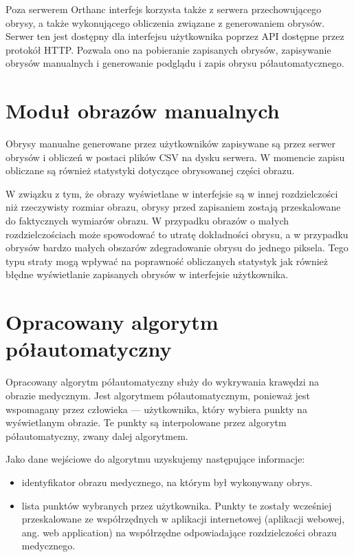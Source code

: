\documentclass[a4paper,11pt,twoside,openright]{report}
\theoremstyle{definition}
\begin{document}
Poza serwerem Orthanc interfejs korzysta także z serwera przechowującego obrysy,
a także wykonującego obliczenia związane z generowaniem obrysów. Serwer ten jest
dostępny dla interfejsu użytkownika poprzez API dostępne przez protokół HTTP.
Pozwala ono na pobieranie zapisanych obrysów, zapisywanie obrysów manualnych i
generowanie podglądu i zapis obrysu półautomatycznego.

\section {Moduł obrazów manualnych}

Obrysy manualne generowane przez użytkowników zapisywane są przez serwer obrysów
i obliczeń w postaci plików CSV na dysku serwera. W momencie zapisu obliczane są
również statystyki dotyczące obrysowanej części obrazu.

W związku z tym, że obrazy wyświetlane w interfejsie są w innej rozdzielczości
niż rzeczywisty rozmiar obrazu, obrysy przed zapisaniem zostają przeskalowane do
faktycznych wymiarów obrazu. W przypadku obrazów o małych rozdzielczościach może
spowodować to utratę dokładności obrysu, a w przypadku obrysów bardzo małych
obszarów zdegradowanie obrysu do jednego piksela. Tego typu straty mogą wpływać
na poprawność obliczanych statystyk jak również błędne wyświetlanie zapisanych
obrysów w interfejsie użytkownika.

\section {Opracowany algorytm półautomatyczny}

Opracowany algorytm półautomatyczny służy do wykrywania krawędzi na obrazie
medycznym. Jest algorytmem półautomatycznym, ponieważ jest wspomagany przez
człowieka --- użytkownika, który wybiera punkty na wyświetlanym obrazie. Te punkty
są interpolowane przez algorytm półautomatyczny, zwany dalej algorytmem.

Jako dane wejściowe do algorytmu uzyskujemy następujące informacje:
\begin{itemize}[noitemsep]
\item {identyfikator obrazu medycznego, na którym był wykonywany obrys.}
\item {lista punktów wybranych przez użytkownika. Punkty te zostały wcześniej
przeskalowane ze współrzędnych w aplikacji internetowej (aplikacji webowej, ang.
web application) na współrzędne odpowiadające rozdzielczości obrazu medycznego.}
\end{itemize}
\end{document}
